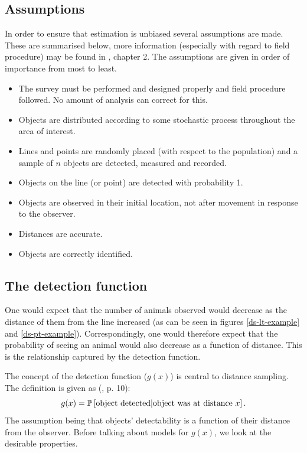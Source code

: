 \subsection{Assumptions}
In order to ensure that estimation is unbiased several assumptions are made. These are summarised below, more information (especially with regard to field procedure) may be found in \cite{IDS}, chapter 2. The assumptions are given in order of importance from most to least.
\begin{itemize}
	\item The survey must be performed and designed properly and field procedure followed. No amount of analysis can correct for this.
	\item Objects are distributed according to some stochastic process throughout the area of interest.
	\item Lines and points are randomly placed (with respect to the population) and a sample of $n$ objects are detected, measured and recorded.
	\item Objects on the line (or point) are detected with probability 1.
	\item Objects are observed in their initial location, not after movement in response to the observer.
	\item Distances are accurate.
	\item Objects are correctly identified.
\end{itemize}

\subsection{The detection function}
One would expect that the number of animals observed would decrease as the distance of them from the line increased (as can be seen in figures \ref{ds-lt-example} and \ref{ds-pt-example}). Correspondingly, one would therefore expect that the probability of seeing an animal would also decrease as a function of distance. This is the relationship captured by the detection function.

The concept of the detection function ($g(x)$) is central to distance sampling. The definition is given as (\cite{IDS}, p. 10):
\begin{equation*}
g(x)=\mathbb{P}\left[ \text{object detected} | \text{object was at distance } x \right].
\end{equation*}
The assumption being that objects' detectability is a function of their distance from the observer. Before talking about models for $g(x)$, we look at the desirable properties.

